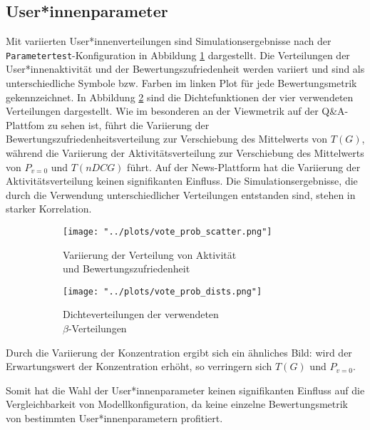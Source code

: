 \subsection{User*innenparameter}

Mit variierten User*innenverteilungen sind Simulationsergebnisse nach der \texttt{Parametertest}-Konfiguration in Abbildung \ref{fig:user_params_a} dargestellt. Die Verteilungen der User*innenaktivität und der Bewertungszufriedenheit werden variiert und sind als unterschiedliche Symbole bzw. Farben im linken Plot für jede Bewertungsmetrik gekennzeichnet. In Abbildung  \ref{fig:user_params_b} sind die Dichtefunktionen der vier verwendeten Verteilungen dargestellt. Wie im besonderen an der Viewmetrik auf der Q\&A-Plattfom zu sehen ist, führt die Variierung der Bewertungszufriedenheitsverteilung zur Verschiebung des Mittelwerts von $T(G)$, während die Variierung der Aktivitätsverteilung zur Verschiebung des Mittelwerts von $P_{v = 0}$ und $T(nDCG)$ führt. Auf der News-Plattform hat die Variierung der Aktivitätsverteilung keinen signifikanten Einfluss. Die Simulationsergebnisse, die durch die Verwendung unterschiedlicher Verteilungen entstanden sind, stehen in starker Korrelation. 

\begin{figure}[!h]
	\begin{subfigure}{0.5\textwidth}
		\texttt{[image: "../plots/vote\_prob\_scatter.png"]}
		\caption{Variierung der Verteilung von Aktivität\\ und Bewertungszufriedenheit}
		\label{fig:user_params_a}
	\end{subfigure}
	\begin{subfigure}{0.5\textwidth}
		\texttt{[image: "../plots/vote\_prob\_dists.png"]}
		\caption{Dichteverteilungen der verwendeten \\ $\beta$-Verteilungen}
		\label{fig:user_params_b}
	\end{subfigure}
	\caption{}
	\label{fig:user_params}	
\end{figure}

Durch die Variierung der Konzentration ergibt sich ein ähnliches Bild: wird der Erwartungswert der Konzentration erhöht, so verringern sich $T(G)$ und $P_{v=0}$. %

Somit hat die Wahl der User*innenparameter keinen signifikanten Einfluss auf die Vergleichbarkeit von Modellkonfiguration, da keine einzelne Bewertungsmetrik von bestimmten User*innenparametern profitiert.


